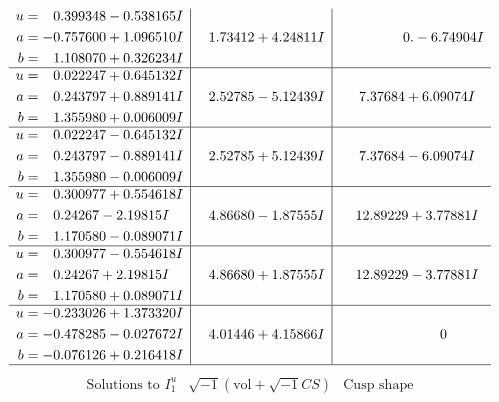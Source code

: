 \documentclass[1p]{elsarticle_modified}
\theoremstyle{definition}
\newcommand{\I}{\sqrt{-1}}
\begin{document}
$$\begin{array}{c|c|c}
\begin{aligned}
u &= \phantom{-}0.399348 - 0.538165 I \\
a &= -0.757600 + 1.096510 I \\
b &= \phantom{-}1.108070 + 0.326234 I\end{aligned}
 & \phantom{-}1.73412 + 4.24811 I & \phantom{-0.000000 } 0. - 6.74904 I \\ \hline\begin{aligned}
u &= \phantom{-}0.022247 + 0.645132 I \\
a &= \phantom{-}0.243797 + 0.889141 I \\
b &= \phantom{-}1.355980 + 0.006009 I\end{aligned}
 & \phantom{-}2.52785 - 5.12439 I & \phantom{-}7.37684 + 6.09074 I \\ \hline\begin{aligned}
u &= \phantom{-}0.022247 - 0.645132 I \\
a &= \phantom{-}0.243797 - 0.889141 I \\
b &= \phantom{-}1.355980 - 0.006009 I\end{aligned}
 & \phantom{-}2.52785 + 5.12439 I & \phantom{-}7.37684 - 6.09074 I \\ \hline\begin{aligned}
u &= \phantom{-}0.300977 + 0.554618 I \\
a &= \phantom{-}0.24267 - 2.19815 I \\
b &= \phantom{-}1.170580 - 0.089071 I\end{aligned}
 & \phantom{-}4.86680 - 1.87555 I & \phantom{-}12.89229 + 3.77881 I \\ \hline\begin{aligned}
u &= \phantom{-}0.300977 - 0.554618 I \\
a &= \phantom{-}0.24267 + 2.19815 I \\
b &= \phantom{-}1.170580 + 0.089071 I\end{aligned}
 & \phantom{-}4.86680 + 1.87555 I & \phantom{-}12.89229 - 3.77881 I \\ \hline\begin{aligned}
u &= -0.233026 + 1.373320 I \\
a &= -0.478285 - 0.027672 I \\
b &= -0.076126 + 0.216418 I\end{aligned}
 & \phantom{-}4.01446 + 4.15866 I & \phantom{-0.000000 } 0\\
 \hline 
 \end{array}$$\newpage$$\begin{array}{c|c|c}  
\text{Solutions to }I^u_{1}& \I (\text{vol} + \sqrt{-1}CS) & \text{Cusp shape}\\

\end{array}$$
\end{document}
